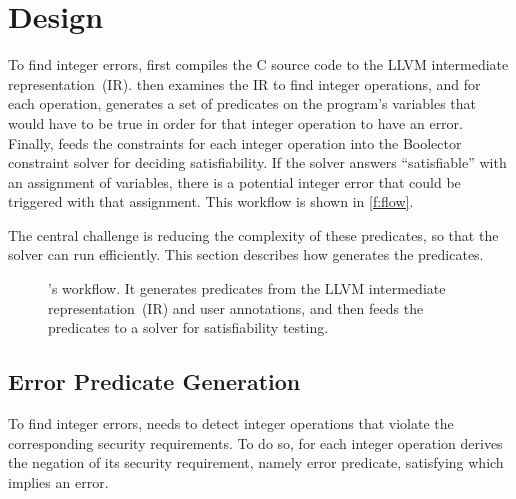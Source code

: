 \section{Design}
\label{s:gen}

To find integer errors, \sys first compiles the C source code to the
LLVM intermediate representation~(IR).  \sys then examines the IR to
find integer operations, and for each operation, \sys generates a
set of predicates on the program's variables that would have to be
true in order for that integer operation to have an error.  Finally,
\sys feeds the constraints for each integer operation into the
Boolector constraint solver for deciding satisfiability.  If the
solver answers ``satisfiable'' with an assignment of variables,
there is a potential integer error that could be triggered with
that assignment.  This workflow is shown in \autoref{f:flow}.


The central challenge is reducing the complexity of these predicates,
so that the solver can run efficiently.  This section describes how
\sys generates the predicates.

\begin{figure}
\centering
\resizebox{\linewidth}{!}{

}
\caption{\sys's workflow.  It generates predicates from the LLVM
intermediate representation~(IR) and user annotations, and then feeds
the predicates to a solver for satisfiability testing.}
\label{f:flow}
\end{figure}

\subsection{Error Predicate Generation}
\label{s:gen:err}

To find integer errors, \sys needs to detect integer operations
that violate the corresponding security requirements.
To do so, for each integer operation \sys derives
the negation of its security requirement, namely error predicate,
satisfying which implies an error.

